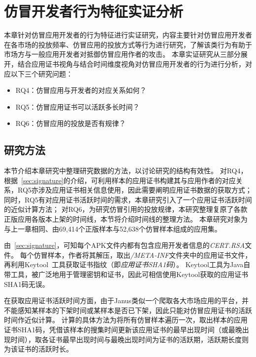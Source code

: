 \chapter{仿冒开发者行为特征实证分析}
\label{chp:discoveries_behavior}

本章针对仿冒应用开发者的行为特征进行实证研究，内容主要针对仿冒应用开发者在各市场的投放频率、仿冒应用的投放方式等行为进行研究，了解该类行为有助于市场方与一般应用开发者对抵御仿冒应用作者的攻击。
本章实证研究从三部分展开，结合应用证书视角与结合时间维度视角对仿冒应用开发者的行为进行分析，对应以下三个研究问题：

\begin{itemize}
    \item RQ4：仿冒应用与开发者的对应关系如何？
    \item RQ5：仿冒应用证书可以活跃多长时间？
    \item RQ6：仿冒应用的投放是否有规律？
\end{itemize}

\section{研究方法}

本节介绍本章研究中整理研究数据的方法，以讨论研究的结构有效性。
对RQ4，根据~\autoref{sec:signature}的介绍，可利用样本的应用证书构建其与应用作者的对应关系，RQ5亦涉及应用证书相关信息使用，因此需要阐明应用证书数据的获取方式；
同时，RQ5有对应用证书活跃时间的需求，本章研究引入了一个应用证书活跃时间的近似计算方法；
对RQ6，为研究仿冒引用的投放规律，本研究整理复原了各款正版应用各版本上架的时间线，本节将介绍时间线的整理方法。
本章研究对象为与上一章相同、由69,414个正版样本与52,638个仿冒样本组成的应用集。

由~\autoref{sec:signature}，可知每个APK文件内都有包含应用开发者信息的\textit{CERT.RSA}文件。
每个仿冒样本，作者将其解压，取出\textit{/META-INF}文件夹中的应用证书文件，再利用Keytool~\cite{keytool}工具获取证书指纹（即\textit{应用证书SHA1码}）。
Keytool工具为Java自带工具，被广泛地用于管理密钥和证书，因此可相信使用Keytool获取的应用证书SHA1码无误。

在获取应用证书活跃时间方面，由于Janus类似一个爬取各大市场应用的平台，并不能感知某样本的下架时间或某样本是否已下架，因此只能对仿冒应用证书的活跃时间作近似计算。
计算的具体方法为将所有仿冒样本遍历一次，取出样本的应用证书SHA1码，凭借该样本的搜集时间更新该应用证书的最早出现时间（或最晚出现时间），取各证书最早出现时间与最晚出现时间为证书的活跃期，活跃期长度则为该证书的活跃时长。

